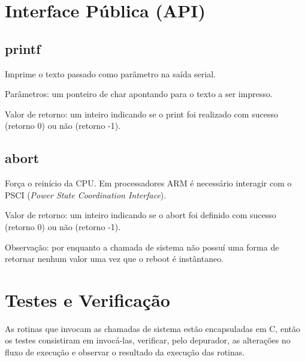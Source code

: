 \section{Interface Pública (API)}
%
%
\subsection{printf}
Imprime o texto passado como parâmetro na saída serial.

Parâmetros: um ponteiro de char apontando para o texto a ser impresso.

Valor de retorno: um inteiro indicando se o print foi realizado com sucesso (retorno 0) ou não (retorno -1).

\subsection{abort}
Força o reinício da CPU. Em processadores ARM é necessário interagir com o PSCI (\textit{Power State Coordination Interface}).

Valor de retorno: um inteiro indicando se o abort foi definido com sucesso (retorno 0) ou não (retorno -1).

Observação: por enquanto a chamada de sistema não possuí uma forma de retornar nenhum valor uma vez que o reboot é instântaneo.
\section{Testes e Verificação}
%
%

As rotinas que invocam as chamadas de sistema estão encapsuladas em C, então os testes consistiram em invocá-las, verificar, pelo depurador, as alterações no fluxo de execução e observar o resultado da execução das rotinas.

